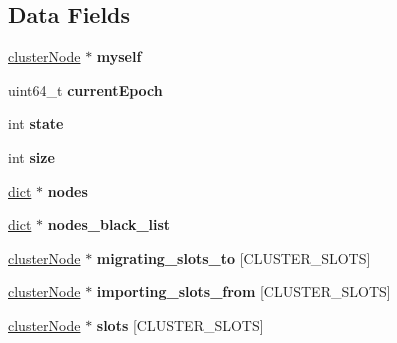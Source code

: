 \subsection*{Data Fields}
\begin{DoxyCompactItemize}
\item 
\mbox{\label{structclusterState_a40512f248f0162974ee06af5a1ab3d0c}} 
\hyperlink{structclusterNode}{cluster\+Node} $\ast$ {\bfseries myself}
\item 
\mbox{\label{structclusterState_a5119e8f4572f08816e666b1a078ba63c}} 
uint64\+\_\+t {\bfseries current\+Epoch}
\item 
\mbox{\label{structclusterState_a21aad7dbd75931914c80348cb00ae37b}} 
int {\bfseries state}
\item 
\mbox{\label{structclusterState_ac412fd88c5d16098266b34a8ca983906}} 
int {\bfseries size}
\item 
\mbox{\label{structclusterState_aa931d12287ceee735a18a2bbf22575fb}} 
\hyperlink{structdict}{dict} $\ast$ {\bfseries nodes}
\item 
\mbox{\label{structclusterState_af1282691ef30aad603edaf8573864364}} 
\hyperlink{structdict}{dict} $\ast$ {\bfseries nodes\+\_\+black\+\_\+list}
\item 
\mbox{\label{structclusterState_ac79d09770ee5089effad9ba6b60d8ea7}} 
\hyperlink{structclusterNode}{cluster\+Node} $\ast$ {\bfseries migrating\+\_\+slots\+\_\+to} \mbox{[}C\+L\+U\+S\+T\+E\+R\+\_\+\+S\+L\+O\+TS\mbox{]}
\item 
\mbox{\label{structclusterState_a63639e9efbfdc877fa58a42d5609e49a}} 
\hyperlink{structclusterNode}{cluster\+Node} $\ast$ {\bfseries importing\+\_\+slots\+\_\+from} \mbox{[}C\+L\+U\+S\+T\+E\+R\+\_\+\+S\+L\+O\+TS\mbox{]}
\item 
\mbox{\label{structclusterState_a3cb4d898f159addb27ef10d737d77842}} 
\hyperlink{structclusterNode}{cluster\+Node} $\ast$ {\bfseries slots} \mbox{[}C\+L\+U\+S\+T\+E\+R\+\_\+\+S\+L\+O\+TS\mbox{]}
\item 

\end{DoxyCompactItemize}

